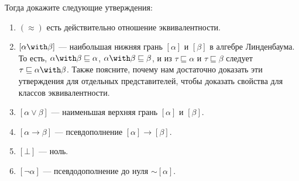 \documentclass[10pt,a4paper,oneside]{article}
\begin{document}
\begin{enumerate}
Тогда докажите следующие утверждения:

\begin{enumerate}
\item $(\approx)$ есть действительно отношение эквивалентности.
\item $[\alpha\with\beta]$ --- наибольшая нижняя грань $[\alpha]$ и $[\beta]$ в алгебре Линденбаума.
То есть, $\alpha\with\beta \sqsubseteq \alpha$, $\alpha\with\beta \sqsubseteq \beta$, и из $\tau \sqsubseteq \alpha$
и $\tau \sqsubseteq \beta$ следует $\tau \sqsubseteq \alpha\with\beta$. Также поясните, почему 
нам достаточно доказать эти утверждения для отдельных представителей,
чтобы доказать свойства для классов эквивалентности.
\item $[\alpha\vee\beta]$ --- наименьшая верхняя грань $[\alpha]$ и $[\beta]$.
\item $[\alpha\rightarrow\beta]$ --- псевдополнение $[\alpha]\rightarrow[\beta]$.
\item $[\bot]$ --- ноль.
\item $[\neg\alpha]$ --- псевдодополнение до нуля $\sim[\alpha]$.
\end{enumerate}

\end{enumerate}
\end{document}
